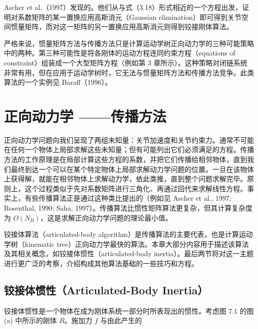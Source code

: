 \documentclass[10pt,a4paper]{book}
\theoremstyle{thmstyle} %
\theoremstyle{defstyle} %
\theoremstyle{prostyle} %
\begin{document}
Ascher et al.（1997）发现的。他们从与式（3.18）形式相近的一个方程出发，证明对系数矩阵的某一置换应用高斯消元（Gaussian elimination）即可得到关节空间惯量矩阵，而对这一矩阵的另一置换应用高斯消元则得到铰接刚体算法。



严格来说，惯量矩阵方法与传播方法只是计算运动学树正向动力学的三种可能策略中的两种。第三种可能性是将各刚体的运动方程连同约束方程（equations of constraint）组装成一个大型矩阵方程（例如第 3 章所示）。这种策略对闭链系统非常有用，但在应用于运动学树时，它无法与惯量矩阵方法和传播方法竞争。此类算法的一个实例见 Baraff（1996）。



\chapter{正向动力学 ——传播方法}









正向动力学问题向我们呈现了两组未知量：关节加速度和关节约束力。通常不可能在任何一个物体上局部求解这些未知量；但有可能列出它们必须满足的方程。传播方法的工作原理是在局部计算这些方程的系数，并把它们传播给相邻物体，直到我们最终到达一个可以在某个特定物体上局部求解动力学问题的位置。一旦在该物体上获得解，就能在相邻物体上求解动力学，依此类推，直到整个问题求解完毕。原则上，这个过程类似于先对系数矩阵进行三角化、再通过回代来求解线性方程。事实上，有些传播算法正是通过这种类比提出的（例如见 Ascher et al., 1997; Rosenthal, 1990; Saha, 1997）。传播算法比惯性矩阵算法更复杂，但其计算复杂度为 $O(N_B)$，这是求解正向动力学问题的理论最小值。



铰接体算法（articulated-body algorithm）是传播算法的主要代表，也是计算运动学树（kinematic tree）正向动力学最快的算法。本章大部分内容用于描述该算法及其相关概念，如铰接体惯性（articulated-body inertia）。最后两节将对这一主题进行更广泛的考察，介绍构成其他算法基础的一些技巧和方程。



\section{铰接体惯性（Articulated-Body Inertia）}





铰接体惯性是一个物体在成为刚体系统一部分时所表现出的惯性。考虑图 7.1 的图 (a) 中所示的刚体 $B$。施加力 $f$ 与由此产生的
\end{document}
